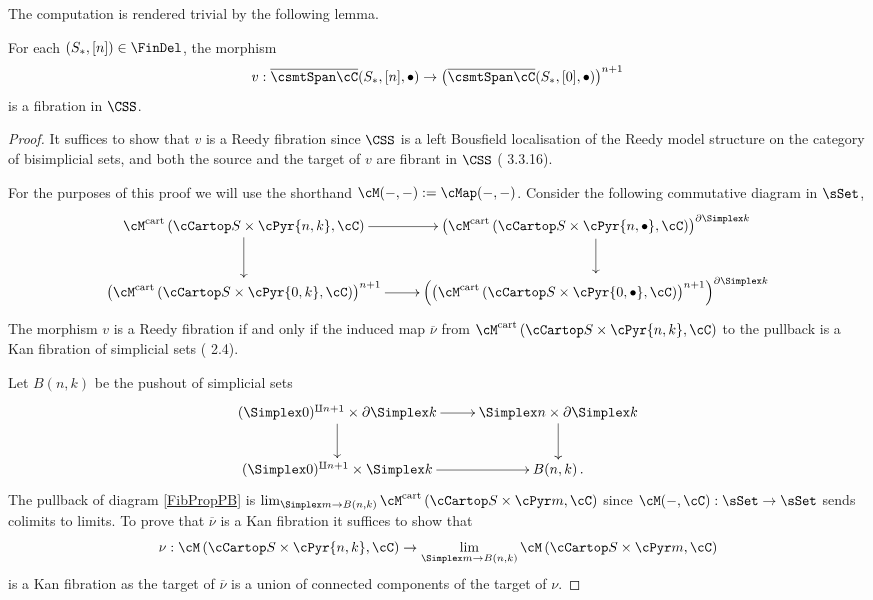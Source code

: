 \documentclass[a4paper]{article}
\numberwithin{equation}{section}
\begin{document}
The computation is rendered trivial by the following lemma.
\begin{lem}
\label{FibProp}
 For each $(S_*,[n]) \in \FinDel$, the morphism 
 \begin{equation*}
 v:\overline{\csmtSpan \cC}(S_*,[n], \bullet) \to \left(\overline{\csmtSpan \cC}(S_*,[0],\bullet)\right)^{n+1}
 \end{equation*}
 is a fibration in $\CSS$.
\end{lem}
\begin{proof}
 It suffices to show that $v$ is a Reedy fibration since $\CSS$ is a left Bousfield localisation of the Reedy model structure on the category of bisimplicial sets, and both the source and the target of $v$ are fibrant in $\CSS$ (\cite{Hirschhorn} 3.3.16).
 
 For the purposes of this proof we will use the shorthand $\cM(-,-) := \cMap(-,-)$. Consider the following commutative diagram in $\sSet$,
 \begin{equation}
 \label{FibPropPB}
  \xymatrix{\cM^{\rm cart} \left(\cCartop S \times \cPyr {n,k}, \cC\right) \ar[r] \ar[d] & \left( \cM^{\rm cart} \left( \cCartop S \times \cPyr {n,\bullet}, \cC\right) \right)^{\partial \Simplex k} \ar[d] \\
  \left( \cM^{\rm cart} \left(\cCartop S \times \cPyr {0,k}, \cC\right) \right)^{n+1} \ar[r] & \left(\left( \cM^{\rm cart} \left(\cCartop S \times \cPyr {0,\bullet}, \cC\right) \right)^{n+1}\right)^{\partial \Simplex k}}
 \end{equation}
 The morphism $v$ is a Reedy fibration if and only if the induced map $\overline{\nu}$ from $\cM^{\rm cart} \left(\cCartop S \times \cPyr {n,k}, \cC\right)$ to the pullback is a Kan fibration of simplicial sets (\cite{RezkCSS} 2.4).
 
 Let $B(n,k)$ be the pushout of simplicial sets
\begin{equation*}
 \xymatrix{(\Simplex 0)^{\amalg n+1} \times \partial \Simplex k \ar[r] \ar[d] & \Simplex n \times \partial \Simplex k \ar[d] \\
 (\Simplex 0)^{\amalg n+1} \times \Simplex k \ar[r] & B(n,k) \, .}
\end{equation*}
The pullback of diagram \ref{FibPropPB} is $\lim_{\Simplex m \to B(n,k)} \cM^{\rm cart}\left( \cCartop S \times \cPyr m , \cC\right)$ since $\cM (-,\cC):\sSet \to \sSet$ sends colimits to limits. To prove that $\overline{\nu}$ is a Kan fibration it suffices to show that
\begin{equation*}
 \nu: \cM\left(\cCartop S \times \cPyr {n,k}, \cC\right) \to \lim_{\Simplex m \to B(n,k)} \cM \left( \cCartop S \times \cPyr m , \cC\right)
\end{equation*}
is a Kan fibration as the target of $\overline{\nu}$ is a union of connected components of the target of $\nu$.


\end{proof}
\end{document}
